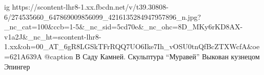  
 
 
 
 

\ifcmt
  ig https://scontent-lhr8-1.xx.fbcdn.net/v/t39.30808-6/274535660_647869009856099_4216135284947957896_n.jpg?_nc_cat=100&ccb=1-5&_nc_sid=5cd70e&_nc_ohc=8D_MKy6rKD8AX-v1a2J&_nc_ht=scontent-lhr8-1.xx&oh=00_AT_6gR8LGSkTFrRQQ7UO6Ike7Ih_vOSU0tnQfBcZTXWcfA&oe=621A639A
  @caption В Саду Камней. Скульптура \enquote{Муравей} Выкован кузнецом Эпингер
\fi
